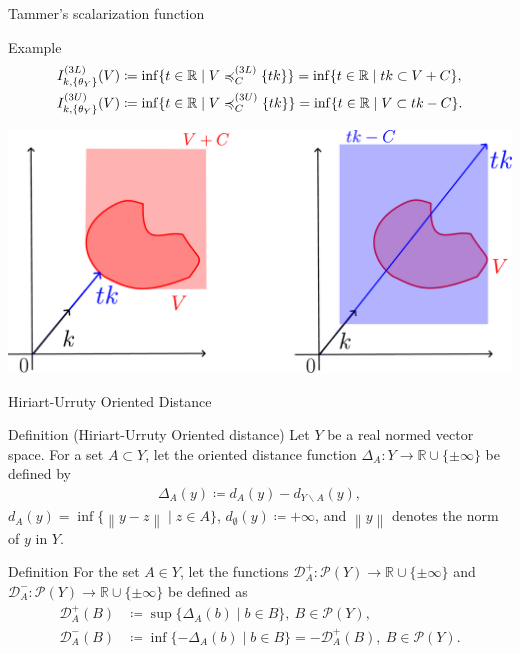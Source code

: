 \documentclass[aspectratio=169, dvipdfmx, 11pt]{beamer}
\newcommand{\RealNumberSet}{\mathbb{R}}
\newcommand{\Norm}[1]{\left\lVert {#1} \right\rVert} %
\begin{document}
\begin{frame}{Tammer's scalarization function}
  \begin{exampleblock}{Example}
    \begin{align}
      I^{(3L)}_{k, \{\theta_{Y}\}} (V) & \coloneq \inf\{ t \in \RealNumberSet \mid V \preccurlyeq_{C}^{(3L)} \{tk\} \}
      = \inf\{ t \in \RealNumberSet \mid tk \subset V + C \}, \notag                                                   \\
      I^{(3U)}_{k, \{\theta_{Y}\}} (V) & \coloneq \inf\{ t \in \RealNumberSet \mid V \preccurlyeq_{C}^{(3U)} \{tk\} \}
      = \inf\{ t \in \RealNumberSet \mid V \subset tk - C \}. \notag
    \end{align}
  \end{exampleblock}
  \centering
  \includegraphics[keepaspectratio, scale=0.10]{figures/eps/tammar_scalarization_example.eps}
\end{frame}


\begin{frame}{Hiriart-Urruty Oriented Distance}
  \begin{block}{Definition (Hiriart-Urruty Oriented distance) \cite{xu2016new}}
    Let $Y$ be a real normed vector space. For a set $A \subset Y$, let the oriented distance function
    $\Delta_{A} \colon Y \to \RealNumberSet\cup\{\pm \infty\}$ be defined by
    \begin{align*}
      \Delta_{A}(y) \coloneq d_{A} (y) - d_{Y \backslash A}(y),
    \end{align*}
    $ d_{A} (y)= \inf\{\Norm{y - z} \mid z \in A\}$, $d_{\emptyset} (y) \coloneq + \infty$,
    and $\Norm{y}$ denotes the norm of $y$ in $Y$.
  \end{block}
  \begin{block}{Definition \cite{xu2016new}}
    For the set $A \in Y$, let the functions $\mathcal{D}^{+}_{A} \colon \mathcal{P}(Y) \to \RealNumberSet \cup \{\pm \infty\}$
    and $\mathcal{D}^{-}_{A} \colon \mathcal{P}(Y) \to \RealNumberSet \cup \{\pm \infty\}$ be defined as
    \begin{align*}
      \mathcal{D}^{+}_{A}(B) & \coloneq \sup\{\Delta_{A}(b) \mid b \in B\},\: B \in \mathcal{P}(Y),                            \\
      \mathcal{D}^{-}_{A}(B) & \coloneq \inf\{-\Delta_{A}(b) \mid b \in B\} = -\mathcal{D}^{+}_{A}(B),\: B \in \mathcal{P}(Y).
    \end{align*}
  \end{block}
\end{frame}
\end{document}
